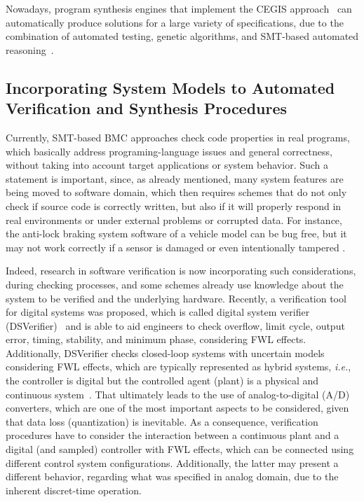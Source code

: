 \documentclass[format=acmsmall, review=false, screen=true]{acmart}
\begin{document}
Nowadays, program synthesis engines that implement the CEGIS approach~\cite{sketch} can automatically produce solutions for a large variety of specifications, due to the combination of automated testing, genetic algorithms, and SMT-based automated reasoning~\cite{Sharma14}.

\subsection{Incorporating System Models to Automated \\ Verification and Synthesis Procedures}

Currently, SMT-based BMC approaches check code properties in real programs, which basically address programing-language issues and general correctness, without taking into account target applications or system behavior. Such a statement is important, since, as already mentioned, many system features are being moved to software domain, which then requires schemes that do not only check if source code is correctly written, but also if it will properly respond in real environments or under external problems or corrupted data. For instance, the anti-lock braking system software of a vehicle model can be bug free, but it may not work correctly if a sensor is damaged or even intentionally tampered \cite{Shoukry}.

Indeed, research in software verification is now incorporating such considerations, during checking processes, and some schemes already use knowledge about the system to be verified and the underlying hardware. Recently, a verification tool for digital systems was proposed, which is called digital system verifier (DSVerifier)~\cite{dsv_spin2015,Monteiro16} and is able to aid engineers to check overflow, limit cycle, output error, timing, stability, and minimum phase, considering FWL effects. Additionally, DSVerifier checks closed-loop systems with uncertain models considering FWL effects, which are typically represented as hybrid systems, {\it i.e.}, the controller is digital but the controlled agent (plant) is a physical and continuous system~\cite{Bessa17}. That ultimately leads to the use of analog-to-digital (A/D) converters, which are one of the most important aspects to be considered, given that data loss (quantization) is inevitable. As a consequence, verification procedures have to consider the interaction between a continuous plant and a digital (and sampled) controller with FWL effects, which can be connected using different control system configurations. Additionally, the latter may present a different behavior, regarding what was specified in analog domain, due to the inherent discret-time operation. 
\end{document}
